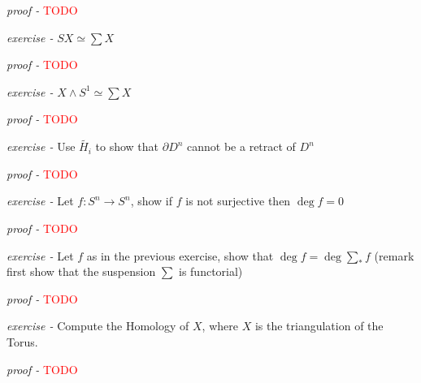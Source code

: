 \documentclass[11pt]{article}
\theoremstyle{definition}
\begin{document}
    \emph{proof - }\textcolor{red}{TODO}


    \emph{exercise - }\label{HEx8} \(SX \simeq \sum X\)

    \emph{proof - }\textcolor{red}{TODO}


    \emph{exercise - }\label{HEx9} \(X \wedge S^1 \simeq \sum X\)

    \emph{proof - }\textcolor{red}{TODO}


    \emph{exercise - }\label{HEx10} Use \(\tilde{H_i}\) to show that \(\partial D^n\) cannot be a retract of \(D^n\)

    \emph{proof - }\textcolor{red}{TODO}


    \emph{exercise - }\label{HEx11} Let \(f: S^n \to S^n\), show if \(f\) is not surjective then \(\deg f = 0\)

    \emph{proof - }\textcolor{red}{TODO}


    \emph{exercise - }\label{HEx12} Let \(f\) as in the previous exercise, show that \(\deg f = \deg \sum_* f \) (remark first  show that the suspension \(\sum\) is functorial)

    \emph{proof - }\textcolor{red}{TODO}



    \emph{exercise - }\label{HEx13} Compute the Homology of \(X\), where \(X\) is the triangulation of the Torus.

    \emph{proof - }\textcolor{red}{TODO}

\end{document}
